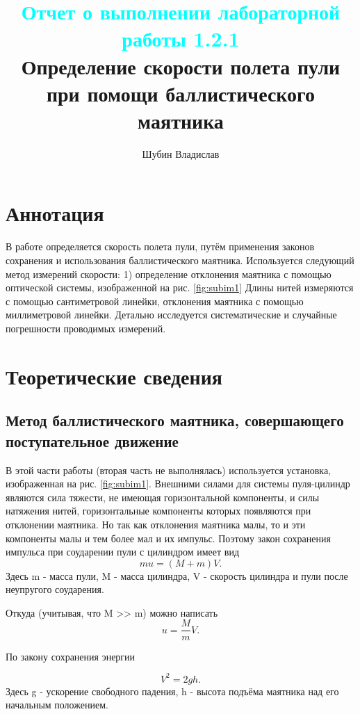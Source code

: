\documentclass[
	a4paper, %
	12pt, %
]{article}
\title{
	\textcolor{cyan}{Отчет о выполнении лабораторной работы 1.2.1}
	\\
	Определение скорости полета пули при помощи баллистического маятника
}
\author{Шубин Владислав}
\begin{document}
    
	
	\maketitle
	
	\section{Аннотация}
	В работе определяется скорость полета пули, путём применения законов сохранения и использования баллистического маятника. Используется следующий метод измерений скорости: 1) определение отклонения маятника с помощью оптической системы, изображенной на рис. \ref{fig:subim1} Длины нитей измеряются с помощью сантиметровой линейки, отклонения маятника с помощью миллиметровой линейки. Детально исследуется систематические и случайные погрешности проводимых измерений.
	
	
	\section{Теоретические сведения}
	
	\subsection{Метод баллистического маятника, совершающего поступательное движение}
	
	В этой части работы (вторая часть не выполнялась) используется установка, изображенная на рис. \ref{fig:subim1}. Внешними силами для системы пуля-цилиндр являются сила тяжести, не имеющая горизонтальной компоненты, и силы натяжения нитей, горизонтальные компоненты которых появляются при отклонении маятника. Но так как отклонения маятника малы, то и эти компоненты малы и тем более мал и их импульс. Поэтому закон сохранения импульса при соударении пули с цилиндром имеет вид
	\begin{equation}
		mu = (M + m)V.
	\end{equation}
	Здесь m - масса пули, M - масса цилиндра, V - скорость цилиндра и пули после неупругого соударения.
	
	Откуда (учитывая, что M >> m) можно написать
	\begin{equation}
		u = \frac{M}{m}V.
	\end{equation}
	
	По закону сохранения энергии
	
	\begin{equation}
		V^2 = 2gh.
	\end{equation}
	Здесь g - ускорение свободного падения, h - высота подъёма маятника над его начальным положением.
	
\end{document}
